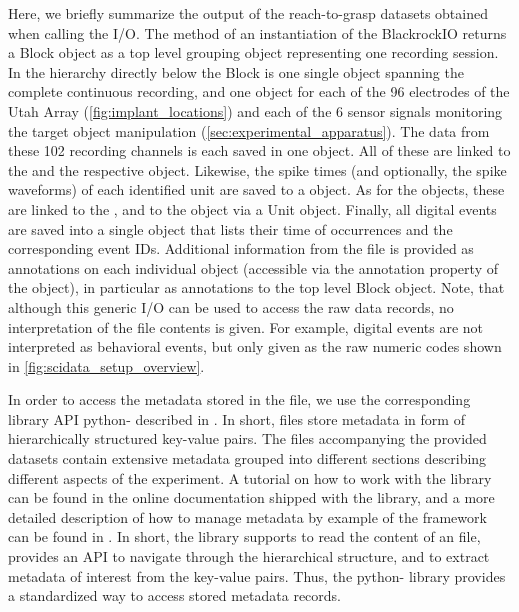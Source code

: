 Here, we briefly summarize the output of the reach-to-grasp datasets obtained when calling the I/O. The  method of an instantiation of the BlackrockIO returns a  Block object as a top level grouping object representing one recording session. In the hierarchy directly below the Block is one single  object spanning the complete continuous recording, and one  object for each of the 96 electrodes of the Utah Array (\cref{fig:implant_locations}) and each of the 6 sensor signals monitoring the target object manipulation (\cref{sec:experimental_apparatus}). The data from these 102 recording channels is each saved in one  object. All of these are linked to the  and the respective  object. Likewise, the spike times (and optionally, the spike waveforms) of each identified unit are saved to a  object. As for the  objects, these are linked to the , and to the  object via a Unit object. Finally, all digital events are saved into a single  object that lists their time of occurrences and the corresponding event IDs. Additional information from the file is provided as annotations on each individual  object (accessible via the annotation property of the object), in particular as annotations to the top level Block object. Note, that although this generic I/O can be used to access the raw data records, no interpretation of the file contents is given. For example, digital events are not interpreted as behavioral events, but only given as the raw numeric codes shown in \cref{fig:scidata_setup_overview}. 

In order to access the metadata stored in the  file, we use the corresponding library API python- described in \citet{Grewe_2011}. In short,  files store metadata in form of hierarchically structured key-value pairs. The  files accompanying the provided datasets contain extensive metadata grouped into different sections describing different aspects of the experiment. A tutorial on how to work with the  library can be found in the online documentation shipped with the library, and a more detailed description of how to manage metadata by example of the  framework can be found in \citet{Zehl_2016}. In short, the library supports to read the content of an  file, provides an API to navigate through the hierarchical structure, and to extract metadata of interest from the key-value pairs. Thus, the python- library provides a standardized way to access stored metadata records. 

